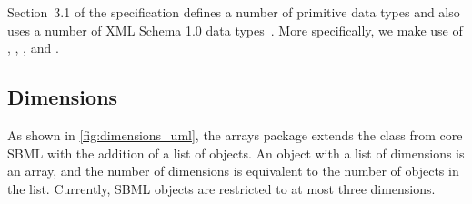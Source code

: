Section~3.1 of the \sbmlthreecore specification defines a number of primitive data types and also uses a number of XML Schema 1.0 data types~\citep{biron:2000}.  More specifically, we make use of , , , and .  







\subsection{Dimensions}
\label{sec:dimension}

As shown in \ref{fig:dimensions_uml}, the arrays package extends the \SBase class from core SBML with the addition of a list of \Dimension objects.  An object with a list of dimensions is an array, and the number of dimensions is equivalent to the number of \Dimension objects in the list.  Currently, SBML objects are restricted to at most three dimensions. 

